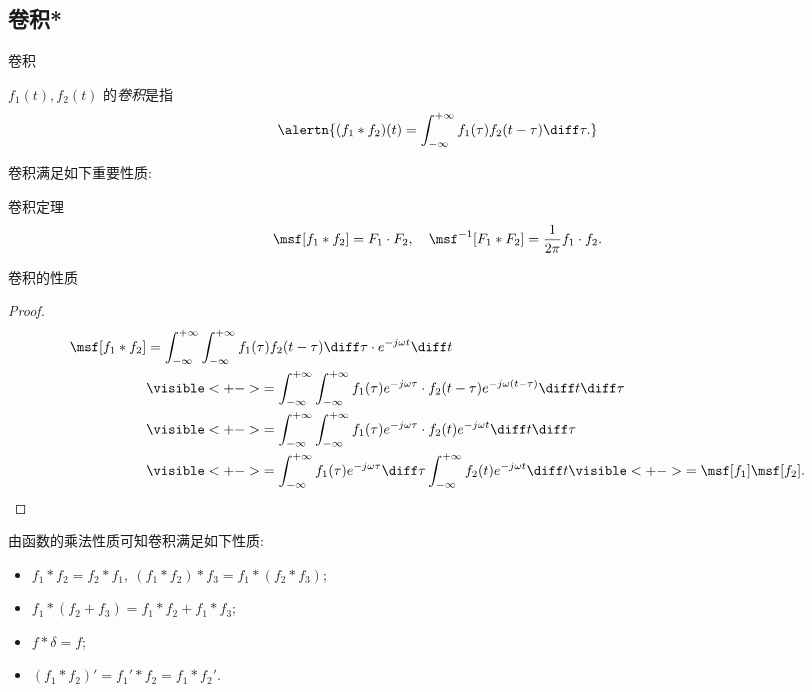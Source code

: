 \subsection{卷积*}
\begin{frame}{卷积\noexer}
	\onslide<+->
	\begin{definition}
		$f_1(t),f_2(t)$ 的\emph{卷积}是指
		\[\alertn{(f_1\ast f_2)(t)=\int_{-\infty}^{+\infty} f_1(\tau)f_2(t-\tau)\diff \tau.}\]
	\end{definition}
	\onslide<+->
	卷积满足如下重要性质:
	\onslide<+->
	\begin{main}{卷积定理}
	\[\msf[f_1\ast f_2]=F_1\cdot F_2,\quad
	\msf^{-1}[F_1\ast F_2]=\frac1{2\pi}f_1\cdot f_2.\]
	\vspace{-\baselineskip}
	\end{main}
\end{frame}


\begin{frame}{卷积的性质\noexer}
	\onslide<+->
	\begin{proof}
		\vspace{-\baselineskip}
		\begin{align*}
			\msf[f_1\ast f_2]&=\int_{-\infty}^{+\infty}\int_{-\infty}^{+\infty}f_1(\tau)f_2(t-\tau)\diff \tau \cdot e^{-j\omega t}\diff t\\
			&\visible<+->{=\int_{-\infty}^{+\infty}\int_{-\infty}^{+\infty}f_1(\tau)e^{-j\omega \tau}\cdot f_2(t-\tau)e^{-j\omega (t-\tau)}\diff t\diff \tau}\\
			&\visible<+->{=\int_{-\infty}^{+\infty}\int_{-\infty}^{+\infty}f_1(\tau)e^{-j\omega \tau}\cdot f_2(t)e^{-j\omega t}\diff t\diff \tau}\\
			&\visible<+->{=\int_{-\infty}^{+\infty}f_1(\tau)e^{-j\omega \tau}\diff\tau\int_{-\infty}^{+\infty}f_2(t)e^{-j\omega t}\diff t}\visible<+->{=\msf[f_1]\msf[f_2].\qedhere}
		\end{align*}
	\end{proof}
	\onslide<+->
	由函数的乘法性质可知卷积满足如下性质:
	\begin{itemize}\bf
		\item $f_1\ast f_2=f_2\ast f_1,\ (f_1\ast f_2)\ast f_3=f_1\ast(f_2\ast f_3)$;
		\item $f_1\ast(f_2+f_3)=f_1\ast f_2+f_1\ast f_3$;
		\item $f\ast\delta=f$;
		\item $(f_1\ast f_2)'=f_1'\ast f_2=f_1\ast f_2'$.
	\end{itemize}
\end{frame}



